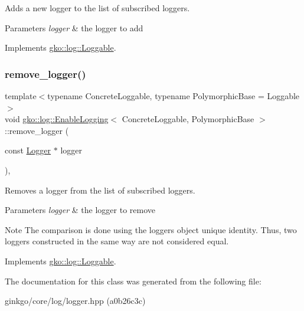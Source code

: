 Adds a new logger to the list of subscribed loggers. 


\begin{DoxyParams}{Parameters}
{\em logger} & the logger to add \\
\hline
\end{DoxyParams}


Implements \hyperlink{classgko_1_1log_1_1Loggable_aa2bb887b5ef7e75fa1a30ee1896ed932}{gko\+::log\+::\+Loggable}.

\mbox{\label{classgko_1_1log_1_1EnableLogging_aba5317f8a03956a61d770e9b07fc65cc}} 
\subsubsection{\texorpdfstring{remove\+\_\+logger()}{remove\_logger()}}
{\footnotesize\ttfamily template$<$typename Concrete\+Loggable, typename Polymorphic\+Base = Loggable$>$ \\
void \hyperlink{classgko_1_1log_1_1EnableLogging}{gko\+::log\+::\+Enable\+Logging}$<$ Concrete\+Loggable, Polymorphic\+Base $>$\+::remove\+\_\+logger (\begin{DoxyParamCaption}\item[{const \hyperlink{classgko_1_1log_1_1Logger}{Logger} $\ast$}]{logger }\end{DoxyParamCaption})\hspace{0.3cm}{\ttfamily [override]}, {\ttfamily [virtual]}}



Removes a logger from the list of subscribed loggers. 


\begin{DoxyParams}{Parameters}
{\em logger} & the logger to remove\\
\hline
\end{DoxyParams}
\begin{DoxyNote}{Note}
The comparison is done using the logger\textquotesingle{}s object unique identity. Thus, two loggers constructed in the same way are not considered equal. 
\end{DoxyNote}


Implements \hyperlink{classgko_1_1log_1_1Loggable_a5de4092a74cf04f30f13636d49aaec8b}{gko\+::log\+::\+Loggable}.



The documentation for this class was generated from the following file\+:\begin{DoxyCompactItemize}
\item 
ginkgo/core/log/logger.\+hpp (a0b26c3c)\end{DoxyCompactItemize}

